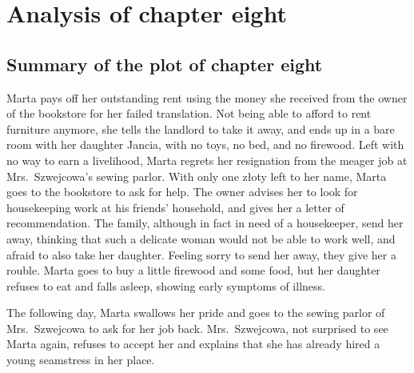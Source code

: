 \section{Analysis of chapter eight}

\subsection{Summary of the plot of chapter eight}

Marta pays off her outstanding rent using the money she received from the owner of the bookstore for her failed translation.
Not being able to afford to rent furniture anymore, she tells the landlord to take it away, and ends up in a bare room with her daughter Jancia, with no toys, no bed, and no firewood.
Left with no way to earn a livelihood, Marta regrets her resignation from the meager job at Mrs.\ Szwejcowa's sewing parlor.
With only one złoty left to her name, Marta goes to the bookstore to ask for help.
The owner advises her to look for housekeeping work at his friends' household, and gives her a letter of recommendation.
The family, although in fact in need of a housekeeper, send her away, thinking that such a delicate woman would not be able to work well, and afraid to also take her daughter.
Feeling sorry to send her away, they give her a rouble. %
Marta goes to buy a little firewood and some food, but her daughter refuses to eat and falls asleep, showing early symptoms of illness.

The following day, Marta swallows her pride and goes to the sewing parlor of Mrs.\ Szwejcowa to ask for her job back.
Mrs.\ Szwejcowa, not surprised to see Marta again, refuses to accept her and explains that she has already hired a young seamstress in her place.
